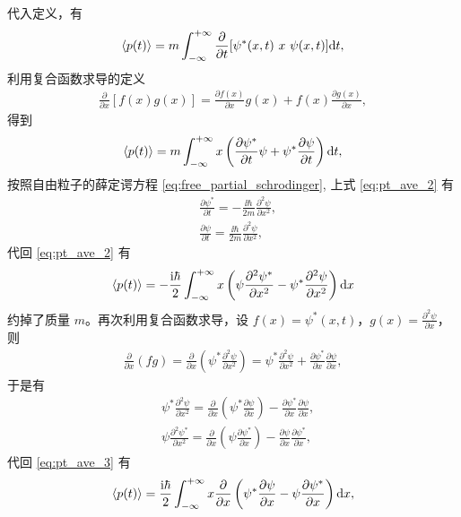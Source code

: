 代入定义，有
\begin{eqnarray}
    \langle p(t) \rangle = m \int_{- \infty}^{+ \infty} \frac{\partial}{\partial t} [\psi^*(x,t)\ x \ \psi(x,t)] \mathrm{d} t,
\end{eqnarray}
利用复合函数求导的定义
\begin{eqnarray}
    \frac{\partial}{\partial x} [f(x) g(x)] = \frac{\partial f(x)}{\partial x} g(x) + f(x) \frac{\partial g(x)}{\partial x},
\end{eqnarray}
得到
\begin{eqnarray}
    \langle p(t) \rangle = m \int_{- \infty}^{+ \infty} x \left(
        \frac{\partial \psi^*}{\partial t}\psi + \psi^* \frac{\partial \psi}{\partial t}
    \right)
    \mathrm{d} t,
    \label{eq:pt_ave_2}
\end{eqnarray}
按照自由粒子的薛定谔方程 \eqref{eq:free_partial_schrodinger}, 上式 \eqref{eq:pt_ave_2} 有
\begin{align}
    & \frac{\partial \psi^*}{\partial t} = - \frac{\ii \hbar}{2m} \frac{\partial^2 \psi}{\partial x^2}, \\
    & \frac{\partial \psi}{\partial t} = \frac{\ii \hbar}{2m} \frac{\partial^2 \psi}{\partial x^2}, 
\end{align}
代回 \eqref{eq:pt_ave_2} 有
\begin{eqnarray}
    \langle p(t) \rangle = -\frac{\mathrm{i}\hbar}{2} \int_{- \infty}^{+ \infty} x \left( \psi \frac{\partial^2\psi^*}{\partial x^2} - \psi^* \frac{\partial^2\psi}{\partial x^2}\right) \mathrm{d} x
    \label{eq:pt_ave_3}
\end{eqnarray}
约掉了质量 $m$。再次利用复合函数求导，设 $f(x) = \psi^*(x,t)$，$g(x) = \frac{\partial^2 \psi}{\partial x}$，则
\begin{align}
\frac{\partial}{\partial x}(f g) = \frac{\partial}{\partial x}\left(\psi^* \frac{\partial^2 \psi}{\partial x^2}\right) = \psi^* \frac{\partial^2\psi}{\partial x^2} + \frac{\partial \psi^*}{\partial x} \frac{\partial \psi}{\partial x}, 
\end{align}
于是有
\begin{align}
    &\psi^* \frac{\partial^2 \psi}{\partial x^2} = \frac{\partial}{\partial x} \left(\psi^*\frac{\partial \psi}{\partial x}\right) -\frac{\partial \psi^*}{\partial x} \frac{\partial \psi}{\partial x}, \\
    &\psi \frac{\partial^2 \psi^*}{\partial x^2} = \frac{\partial}{\partial x} \left(\psi\frac{\partial \psi^*}{\partial x}\right) - \frac{\partial \psi}{\partial x} \frac{\partial \psi^*}{\partial x},
\end{align}
代回 \eqref{eq:pt_ave_3} 有
\begin{eqnarray}
    \langle p(t) \rangle = \frac{\mathrm{i}\hbar}2 \int_{- \infty}^{+ \infty} x \frac{\partial}{\partial x} \left(\psi^* \frac{\partial \psi}{\partial x} - \psi \frac{\partial \psi^*}{\partial x}\right) \mathrm{d} x,
    \label{eq:pt_ave_4}
\end{eqnarray}
